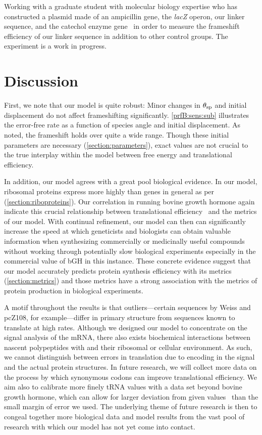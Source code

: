 \documentclass[12pt]{article}
\numberwithin{equation}{section}
\begin{document}
Working with a graduate student with
molecular biology expertise who has constructed a plasmid made of an
ampicillin gene, the \emph{lacZ} operon, our linker sequence, and the
catechol enzyme gene \xylE\ in order to measure the frameshift
efficiency of our linker sequence in addition to other control
groups. The experiment is a work in progress.

\section{Discussion}
\label{section:discussion}

First, we note that our model is quite robust: Minor changes
in $\theta_{\rm{sp}}$ and initial displacement do not affect
frameshifting significantly.
\autoref{prfB:sens:sub} illustrates the error-free rate as
a function of species angle and initial displacement. As noted,
the frameshift holds over quite a wide range. Though these initial
parameters are necessary (\autoref{section:parameters}), exact values
are not
crucial to the true interplay within the model between free energy and
translational efficiency.

In addition, our model agrees with a great pool biological
evidence. In our model, ribosomal proteins express more highly than
genes in general as per \citet{rpoS:process}
(\autoref{section:riboproteins}).  Our correlation in running bovine
growth hormone again indicate this crucial relationship between
translational efficiency~\cite{schoner:bgh} and the metrics of our
model. With continual refinement, our model can then can significantly
increase the speed at which geneticists and biologists can obtain
valuable information when synthesizing commercially or medicinally
useful compounds without working through potentially slow biological
experiments especially in the commercial value of bGH in this
instance.  These concrete evidence suggest that our model
accurately predicts protein synthesis efficiency with its metrics
(\autoref{section:metrics}) and those metrics have a strong
association with the metrics of protein production in biological experiments.

A motif throughout the results is that outliers---certain sequences by
Weiss and pcZ108, for example---differ in primary structure from
sequences known to translate at high rates. Although we designed our
model to concentrate on the signal analysis of the mRNA, there also
exists biochemical interactions between nascent polypeptides with and
their ribosomal or cellular environment.  As such, we cannot
distinguish between errors in translation due to encoding in the
signal and the actual protein structures. In future research, we will
collect more data on the process by which synonymous codons can
improve translational efficiency. We aim also to calibrate more finely
tRNA values with a data set beyond bovine growth hormone, which can
allow for larger deviation from given values~\cite{lalit:mechanics} than
the small margin of error we used. The underlying theme of future
research is then to congeal together more biological data and model
results from the vast pool of research with which our model has not
yet come into contact.
\end{document}
